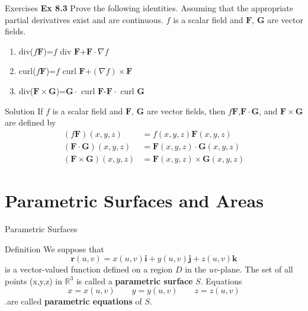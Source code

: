 \documentclass{beamer}
\begin{document}
\begin{frame}{Exercises}
    \textbf{Ex 8.3} Prove the following identities. Assuming that the appropriate partial derivatives exist and are continuous. $f$ is a scalar field and $\boldsymbol{F}$, $\boldsymbol{G}$ are vector fields.\\
    \begin{enumerate}
        \item div($f\boldsymbol{F}$)=$f$ div $\boldsymbol{F}$+$\boldsymbol{F}\cdot \nabla f$
         \item curl($f\boldsymbol{F}$)=$f$ curl $\boldsymbol{F}$+$(\nabla f)\times\boldsymbol{F}$
         \item div($\boldsymbol{F}\times\boldsymbol{G}$)=$\boldsymbol{G}\cdot$ curl $\boldsymbol{F}$-$\boldsymbol{F}\cdot$ curl $\boldsymbol{G}$
    \end{enumerate}
    
\end{frame}

\begin{frame}{Solution}
    If $f$ is a scalar field and $\boldsymbol{F}$, $\boldsymbol{G}$ are vector fields, then $f\boldsymbol{F}$,$\boldsymbol{F}\cdot\boldsymbol{G}$, and $\boldsymbol{F}\times\boldsymbol{G}$ are defined by
    \begin{align*}
        (f\boldsymbol{F})(x,y,z)&=f(x,y,z)\boldsymbol{F}(x,y,z)\\
        (\boldsymbol{F}\cdot\boldsymbol{G})(x,y,z)&=\boldsymbol{F}(x,y,z)\cdot\boldsymbol{G}(x,y,z)\\
        (\boldsymbol{F}\times\boldsymbol{G})(x,y,z)&=\boldsymbol{F}(x,y,z)\times\boldsymbol{G}(x,y,z)
    \end{align*}
\end{frame}

\section{Parametric Surfaces and Areas}

\begin{frame}{Parametric Surfaces}
    \begin{block}{Definition}
        We suppose that 
        \begin{equation*}
            \boldsymbol{r}(u,v)=x(u,v)\boldsymbol{i}+y(u,v)\boldsymbol{j}+z(u,v)\boldsymbol{k}
        \end{equation*}
        is a vector-valued function defined on a region $D$ in the $uv$-plane. The set of all points (x,y,z) in $\mathbb{R}^3$ is called a \textbf{parametric surface} $S$. Equations
        \begin{equation*}
            x=x(u,v)\qquad y=y(u,v) \qquad z=z(u,v)
        \end{equation*}
        .are called \textbf{parametric equations} of $S$.
    \end{block}
\end{frame}
\end{document}
